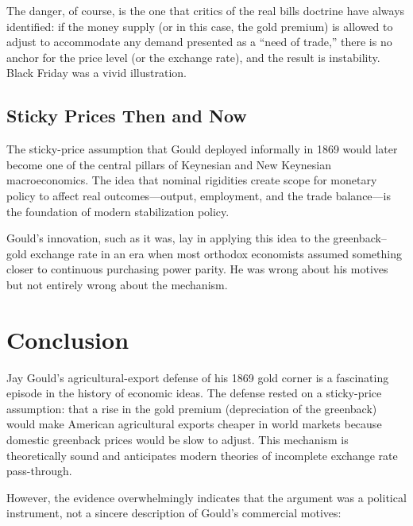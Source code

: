 \documentclass[12pt]{article}
\begin{document}
The danger, of course, is the one that critics of the real bills 
doctrine have always identified: if the money supply (or in this case, 
the gold premium) is allowed to adjust to accommodate any demand 
presented as a ``need of trade,'' there is no anchor for the price 
level (or the exchange rate), and the result is instability. 
Black Friday was a vivid illustration.

\subsection{Sticky Prices Then and Now}

The sticky-price assumption that Gould deployed informally in 1869 would 
later become one of the central pillars of Keynesian and New Keynesian 
macroeconomics. The idea that nominal rigidities create scope for 
monetary policy to affect real outcomes---output, employment, and the 
trade balance---is the foundation of modern stabilization policy.

Gould's innovation, such as it was, lay in applying this idea to the 
greenback--gold exchange rate in an era when most orthodox economists 
assumed something closer to continuous purchasing power parity. He was 
wrong about his motives but not entirely wrong about the mechanism.

\section{Conclusion}

Jay Gould's agricultural-export defense of his 1869 gold corner is a 
fascinating episode in the history of economic ideas. The defense rested 
on a sticky-price assumption: that a rise in the gold premium 
(depreciation of the greenback) would make American agricultural 
exports cheaper in world markets because domestic greenback prices 
would be slow to adjust. This mechanism is theoretically sound and 
anticipates modern theories of incomplete exchange rate pass-through.

However, the evidence overwhelmingly indicates that the argument was a 
political instrument, not a sincere description of Gould's commercial 
motives:
\end{document}
